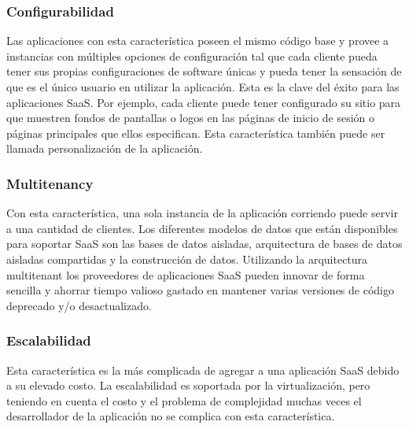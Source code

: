 \subsubsection*{Configurabilidad}
Las aplicaciones con esta característica poseen el mismo código base y provee a instancias con múltiples opciones de configuración tal que cada cliente pueda tener sus propias configuraciones de software únicas y pueda tener la sensación de que es el único usuario en utilizar la aplicación. Esta es la clave del éxito para las aplicaciones SaaS\citep{jadeja2012cloud}. Por ejemplo, cada cliente puede tener configurado su sitio para que muestren fondos de pantallas o logos en las páginas de inicio de sesión o páginas principales que ellos especifican. Esta característica también puede ser llamada personalización de la aplicación.

\subsubsection*{Multitenancy}
Con esta característica, una sola instancia de la aplicación corriendo puede servir a una cantidad de clientes. Los diferentes modelos de datos que están disponibles para soportar SaaS son las bases de datos aisladas, arquitectura de bases de datos aisladas compartidas y la construcción de datos\citep{lee2012web}. Utilizando la arquitectura multitenant los proveedores de aplicaciones SaaS pueden innovar de forma sencilla y ahorrar tiempo valioso gastado en mantener varias versiones de código deprecado y/o desactualizado\citep{kang2011design}.

\subsubsection*{Escalabilidad}
Esta característica es la más complicada de agregar a una aplicación SaaS debido a su elevado costo. La escalabilidad es soportada por la virtualización, pero teniendo en cuenta el costo y el problema de complejidad muchas veces el desarrollador de la aplicación no se complica con esta característica\citep{li2012cooperative}.

